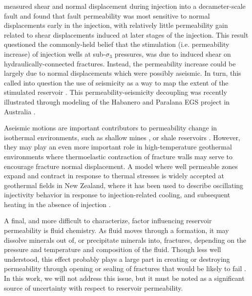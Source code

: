 \citet{Guglielmi_2015} measured shear and normal displacement during injection into a decameter-scale fault and found that fault permeability was most sensitive to normal displacements early in the injection, with relatively little permeability gain related to shear displacements induced at later stages of the injection. This result questioned the commonly-held belief that the stimulation (i.e. permeability increase) of injection wells at sub-$\sigma_{3}$ pressures, was due to induced shear on hydraulically-connected fractures. Instead, the permeability increase could be largely due to normal displacements which were possibly aseismic. In turn, this called into question the use of seismicity as a way to map the extent of the stimulated reservoir \citep[e.g.][]{Fang_2018,Yoon_2014,Dempsey_2015}. This permeability-seismicity decoupling was recently illustrated through modeling of the Habanero and Paralana EGS project in Australia \citep{Riffault_2018}.

Aseismic motions are important contributors to permeability change in isothermal environments, such as shallow mines \citep{Guglielmi_2015}, or shale reservoirs \citep{Das_2011}. However, they may play an even more important role in high-temperature geothermal environments where thermoelastic contraction of fracture walls may serve to encourage fracture normal displacement. A model where well permeable zones expand and contract in response to thermal stresses is widely accepted at geothermal fields in New Zealand, where it has been used to describe oscillating injectivity behavior in response to injection-related cooling, and subsequent heating in the absence of injection \citep{grant2013thermal}.

A final, and more difficult to characterize, factor influencing reservoir permeability is fluid chemistry. As fluid moves through a formation, it may dissolve minerals out of, or precipitate minerals into, fractures, depending on the pressure and temperature and composition of the fluid. Though less well understood, this effect probably plays a large part in creating or destroying permeability through opening or sealing of fractures that would be likely to fail \citep{Clearwater_2015}. In this work, we will not address this issue, but it must be noted as a significant source of uncertainty with respect to reservoir permeability.

